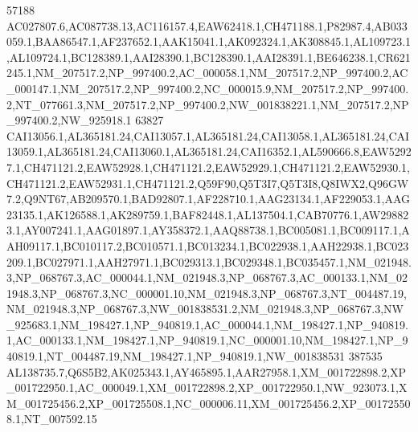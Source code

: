 \documentclass[a4paper]{article}
\begin{document}
\begin{Schunk}
\begin{Soutput}
57188                                                                                                                                                                                                                                                                                                                                                                                                                                                                                                                                                                                                             AC027807.6,AC087738.13,AC116157.4,EAW62418.1,CH471188.1,P82987.4,AB033059.1,BAA86547.1,AF237652.1,AAK15041.1,AK092324.1,AK308845.1,AL109723.1,AL109724.1,BC128389.1,AAI28390.1,BC128390.1,AAI28391.1,BE646238.1,CR621245.1,NM_207517.2,NP_997400.2,AC_000058.1,NM_207517.2,NP_997400.2,AC_000147.1,NM_207517.2,NP_997400.2,NC_000015.9,NM_207517.2,NP_997400.2,NT_077661.3,NM_207517.2,NP_997400.2,NW_001838221.1,NM_207517.2,NP_997400.2,NW_925918.1
63827  CAI13056.1,AL365181.24,CAI13057.1,AL365181.24,CAI13058.1,AL365181.24,CAI13059.1,AL365181.24,CAI13060.1,AL365181.24,CAI16352.1,AL590666.8,EAW52927.1,CH471121.2,EAW52928.1,CH471121.2,EAW52929.1,CH471121.2,EAW52930.1,CH471121.2,EAW52931.1,CH471121.2,Q59F90,Q5T3I7,Q5T3I8,Q8IWX2,Q96GW7.2,Q9NT67,AB209570.1,BAD92807.1,AF228710.1,AAG23134.1,AF229053.1,AAG23135.1,AK126588.1,AK289759.1,BAF82448.1,AL137504.1,CAB70776.1,AW298823.1,AY007241.1,AAG01897.1,AY358372.1,AAQ88738.1,BC005081.1,BC009117.1,AAH09117.1,BC010117.2,BC010571.1,BC013234.1,BC022938.1,AAH22938.1,BC023209.1,BC027971.1,AAH27971.1,BC029313.1,BC029348.1,BC035457.1,NM_021948.3,NP_068767.3,AC_000044.1,NM_021948.3,NP_068767.3,AC_000133.1,NM_021948.3,NP_068767.3,NC_000001.10,NM_021948.3,NP_068767.3,NT_004487.19,NM_021948.3,NP_068767.3,NW_001838531.2,NM_021948.3,NP_068767.3,NW_925683.1,NM_198427.1,NP_940819.1,AC_000044.1,NM_198427.1,NP_940819.1,AC_000133.1,NM_198427.1,NP_940819.1,NC_000001.10,NM_198427.1,NP_940819.1,NT_004487.19,NM_198427.1,NP_940819.1,NW_001838531
387535                                                                                                                                                                                                                                                                                                                                                                                                                                                                                                                                                                                                                                                                                                                                                                                                                                     AL138735.7,Q6S5B2,AK025343.1,AY465895.1,AAR27958.1,XM_001722898.2,XP_001722950.1,AC_000049.1,XM_001722898.2,XP_001722950.1,NW_923073.1,XM_001725456.2,XP_001725508.1,NC_000006.11,XM_001725456.2,XP_001725508.1,NT_007592.15

\end{Soutput}
\end{Schunk}
\end{document}
